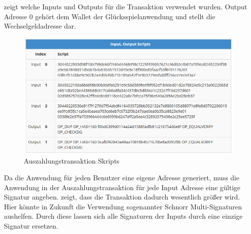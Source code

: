 \label{fig:btc_txn_input_output} zeigt welche Inputs und Outputs für die Transaktion verwendet wurden. Output Adresse 0 gehört dem Wallet der Glücksspielanwendung und stellt die Wechselgeldadresse dar.


\begin{figure}[H]
\centering
\includegraphics[width=1\linewidth]{Figures/btc_gui/btc_txn_input_output_scripts}
\decoRule
\caption{Auszahlungstransaktion Skripts}
\label{fig:btc_txn_input_output_scripts}
\end{figure}

Da die Anwendung für jeden Benutzer eine eigene Adresse generiert, muss die Anwendung in der Auszahlungstransaktion für jede Input Adresse eine gültige Signatur angeben.\label{fig:btc_txn_input_output_scripts} zeigt, dass die Transaktion dadurch wesentlich größer wird. Hier könnte in Zukunft die Verwendung sogenannter Schnorr Multi-Signaturen aushelfen. Durch diese lassen sich alle Signaturen der Inputs durch eine einzige Signatur ersetzen.